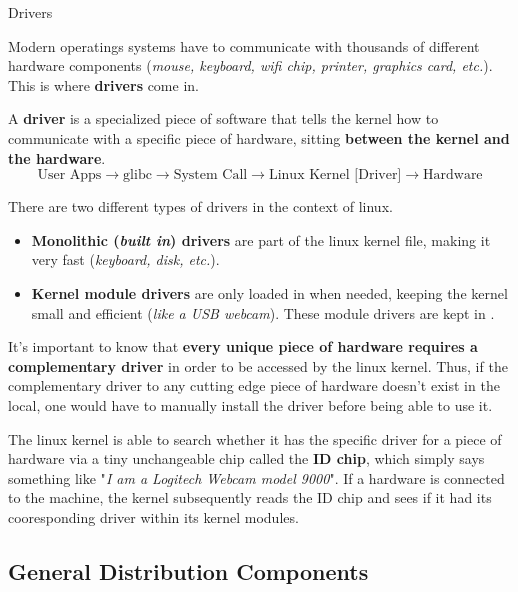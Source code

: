 \documentclass[10pt]{article}
\begin{document}
    \begin{core}[label=core:drivers]{Drivers}

      Modern operatings systems have to communicate with thousands of different hardware components (\textit{mouse, keyboard, wifi chip, printer, graphics card, etc.}). This is where \textbf{drivers} come in.

      A \textbf{driver} is a specialized piece of software that tells the kernel how to communicate with a specific piece of hardware, sitting \textbf{between the kernel and the hardware}. 
      \[
        \text{User Apps} \rightarrow \text{glibc} \rightarrow \text{System Call} \rightarrow \text{Linux Kernel [Driver]} \rightarrow \text{Hardware}
      \]

      There are two different types of drivers in the context of linux.

      \begin{itemize}

        \item \textbf{Monolithic (\textit{built in}) drivers} are part of the linux kernel file, making it very fast (\textit{keyboard, disk, etc.}).

        \item \textbf{Kernel module drivers} are only loaded in when needed, keeping the kernel small and efficient (\textit{like a USB webcam}). These module drivers are kept in .

      \end{itemize}

      It's important to know that \textbf{every unique piece of hardware requires a complementary driver} in order to be accessed by the linux kernel. Thus, if the complementary driver to any cutting edge piece of hardware doesn't exist in the local, one would have to manually install the driver before being able to use it.

      The linux kernel is able to search whether it has the specific driver for a piece of hardware via a tiny unchangeable chip called the \textbf{ID chip}, which simply says something like "\textit{I am a Logitech Webcam model 9000}". If a hardware is connected to the machine, the kernel subsequently reads the ID chip and sees if it had its cooresponding driver within its kernel modules.

    \end{core}

  \subsection{General Distribution Components}
\end{document}
